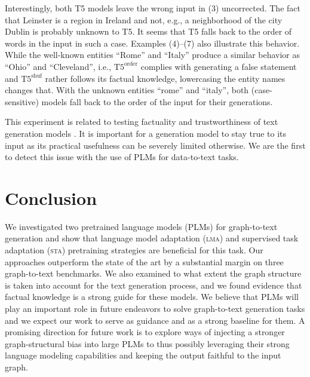 \documentclass[11pt,a4paper]{article}
\newcommand{\shufmodel}[3]{\ensuremath{\text{#1}^{\text{#3}}}}
\begin{document}
\begin{table*}[t]
Interestingly, both T5 models leave the wrong input in (3) uncorrected. The fact that Leinster is a region in Ireland and not, e.g., a neighborhood of the city Dublin is probably unknown to T5. It seems that T5 falls back to the order of words in the input in such a case.
Examples (4)--(7) also illustrate this behavior. While the well-known entities ``Rome'' and ``Italy'' produce a similar behavior as ``Ohio'' and ``Cleveland'', i.e., \shufmodel{T5}{small}{order} complies with generating a false statement and \shufmodel{T5}{small}{shuf} rather follows its factual knowledge, lowercasing the entity names changes that.
With the unknown entities ``rome'' and ``italy'', both (case-sensitive) models fall back to the order of the input for their generations.


This experiment is related to testing factuality and trustworthiness of text generation models \cite{wiseman-etal-2017-challenges, falke-etal-2019-ranking}. It is important for a generation model to stay true to its input as its practical usefulness can be severely limited otherwise.
We are the first to detect this issue with the use of PLMs for data-to-text tasks.









\section{Conclusion}

We investigated two pretrained language models (PLMs) for graph-to-text generation and show that  language model adaptation (\textsc{lma}) and supervised task adaptation (\textsc{sta}) pretraining strategies are beneficial for this task. Our approaches outperform the state of the art by a substantial margin on three graph-to-text benchmarks. We also examined to what extent the graph structure is taken into account for the text generation process, and we found evidence that factual knowledge is a strong guide for these models. We believe that PLMs will play an important role in future endeavors to solve graph-to-text generation tasks and we expect our work to serve as guidance and as a strong baseline for them. A promising direction for future work is to explore ways of injecting a stronger graph-structural bias into large PLMs to thus possibly leveraging their strong language modeling capabilities and keeping the output faithful to the input graph.







\end{table*}
\end{document}
